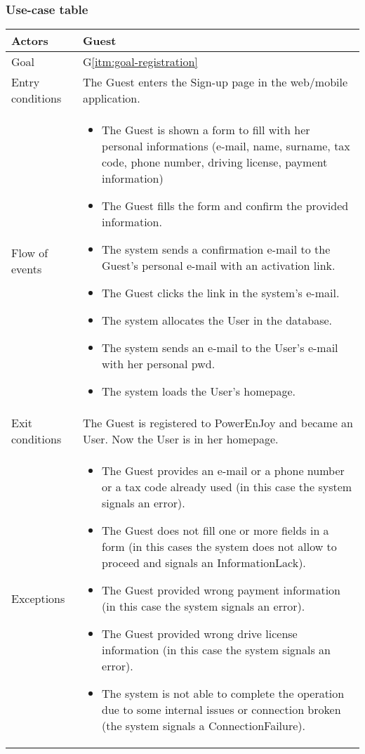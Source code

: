 \subsubsection{Use-case table}
\begin{center}
  \begin{tabular}{ l | p{10cm} }
    \hline
    Actors & Guest\\ \hline
    Goal & G\ref{itm:goal-registration}\\ \hline
    Entry conditions & The Guest enters the Sign-up page in the web/mobile application. 
     \\ \hline
    Flow of events &
    \begin{itemize} %
      \item The Guest is shown a form to fill with her personal informations (e-mail, name, surname, tax code, phone number, driving license, payment information) %
      \item The Guest fills the form and confirm the provided information.
      \item The system sends a confirmation e-mail to the Guest's personal e-mail with an activation link.
      \item The Guest clicks the link in the system's e-mail.
      \item The system allocates the User in the database.
      \item The system sends an e-mail to the User's e-mail with her personal \gls{pwd}.
      \item The system loads the User's homepage.
    \end{itemize} \\ \hline
    Exit conditions & The Guest is registered to PowerEnJoy and became an User. Now the User is in her homepage. \\ \hline
  	Exceptions & 
    \begin{itemize}
      \item The Guest provides an e-mail or a phone number or a tax code already used (in this case the system signals an error).
      \item The Guest does not fill one or more fields in a form (in this cases the system does not allow to proceed and signals an InformationLack).
      \item The Guest provided wrong payment information (in this case the system signals an error).
      \item The Guest provided wrong drive license information (in this case the system signals an error).
      \item The system is not able to complete the operation due to some internal issues or connection broken (the system signals a ConnectionFailure). %
    \end{itemize} \\ \hline
  \end{tabular}
\end{center}


